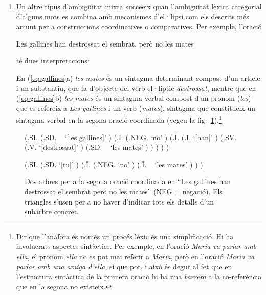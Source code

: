\begin{enumerate}
  \item Un altre tipus d'ambigüitat mixta succeeix quan l'ambigüitat
    lèxica categorial d'alguns mots es combina amb mecanismes
    d'el·lipsi com els descrits més amunt per a construccions
    coordinatives o comparatives.  Per exemple, l'oració
    \begin{exemple}
      Les gallines han destrossat el sembrat, però no les mates
    \end{exemple}
    té dues interpretacions:
    En (\ref{eq:gallines}a) \emph{les mates} és un sintagma
    determinant compost d'un article i un substantiu, que fa d'objecte
    del verb el·líptic \emph{destrossat}, mentre que en
    (\ref{eq:gallines}b) \emph{les mates} és un sintagma verbal
    compost d'un pronom ({\em les}) que es refereix a \emph{Les
      gallines} i un verb ({\em mates}), sintagma que constitueix un
    sintagma verbal en la segona oració coordinada (vegeu la
    fig.~\ref{fg:mates}).\footnote{Dir que l'anàfora és només un
      procés lèxic és una simplificació. Hi ha involucrats aspectes
      sintàctics. Per exemple, en l'oració \emph{Maria va parlar amb
        ella}, el pronom \emph{ella} no es pot mai referir a
      \emph{Maria}, però en l'oració \emph{Maria va parlar amb una
        amiga d'ella}, sí que pot, i això és degut al fet que en
      l'estructura sintàctica de la primera oració hi ha una
      \emph{barrera} a la co-referència que en la segona no existeix.}
\end{enumerate}

\begin{figure}
\begin{center}
\begin{parsetree}
(.SI. (.SD. ~ `[les gallines]' ) (.{\={I}}. (.NEG. `no' )
(.{\={I}}. (.I. `[han]' ) (.SV. (.V. `[destrossat]' )  (.SD. ~ `les
mates' ) ) ) ) ) 
\end{parsetree}
\end{center}
\begin{center}
\begin{parsetree}
(.SI. (.SD. `[tu]' ) (.{\={I}}. (.NEG. `no' ) (.{\={I}}. ~ `les mates'
) ) )
\end{parsetree}
\end{center}
\caption{Dos arbres per a la segona oració coordinada en ``Les
  gallines han destrossat el sembrat però no les mates'' (NEG =
  negació). Els triangles s'usen per a no haver d'indicar tots els
  detalls d'un subarbre concret.}
\label{fg:mates}
\end{figure}

